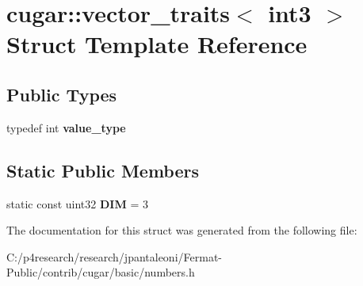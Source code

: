 \hypertarget{structcugar_1_1vector__traits_3_01int3_01_4}{}\section{cugar\+:\+:vector\+\_\+traits$<$ int3 $>$ Struct Template Reference}
\label{structcugar_1_1vector__traits_3_01int3_01_4}
\subsection*{Public Types}
\begin{DoxyCompactItemize}
\item 
\mbox{\label{structcugar_1_1vector__traits_3_01int3_01_4_a2a61b2f04de7d16058d2db0602eb11b3}} 
typedef int {\bfseries value\+\_\+type}
\end{DoxyCompactItemize}
\subsection*{Static Public Members}
\begin{DoxyCompactItemize}
\item 
\mbox{\label{structcugar_1_1vector__traits_3_01int3_01_4_a31d0c6d11936066fb47e740ec43f1283}} 
static const uint32 {\bfseries D\+IM} = 3
\end{DoxyCompactItemize}


The documentation for this struct was generated from the following file\+:\begin{DoxyCompactItemize}
\item 
C\+:/p4research/research/jpantaleoni/\+Fermat-\/\+Public/contrib/cugar/basic/numbers.\+h\end{DoxyCompactItemize}
